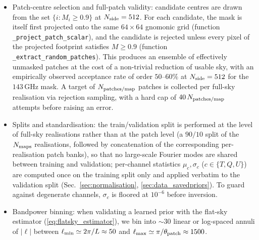 \documentclass[11pt]{article}
\theoremstyle{definition}
\begin{document}
\begin{itemize}[leftmargin=1.5em,itemsep=0.1em]
\begin{equation}
    L = N_{\rm patch}\,\theta_{\rm patch}\simeq 7.15^\circ
    \quad\Rightarrow\quad
    L^2\simeq 51\ \mathrm{deg}^2,
  \end{equation}
  i.e.\ $f_{\rm sky}^{\rm patch}\simeq 0.12\%$ per patch. Curvature corrections are of order $L^2\!\sim\!1.5\times 10^{-2}$ and the flat-sky approximation is accurate. Patch projection is implemented by \texttt{healpy.projector.GnomonicProj}: the temperature channel is resampled by scalar interpolation, while $(Q,U)$ are first resampled and then spin-2 rotated to the local patch frame using Eq.~(\ref{eq:flatsky_estimator})\,'s spin-2 matrix, with rotation angle $\psi(\hat n)$ computed numerically by finite-differencing the projection along the local north direction (function \texttt{\_project\_patch\_tqu}, flag \texttt{rotate\_pol=True}; Sec.~\ref{sec:flatsky}). Non-finite values introduced at projection edges are explicitly replaced by zero.
  \item Patch-centre selection and full-patch validity: candidate centres are drawn from the set $\{i:M_i\geq 0.9\}$ at $N_{\rm side}=512$. For each candidate, the mask is itself first projected onto the same $64\!\times\!64$ gnomonic grid (function \texttt{\_project\_patch\_scalar}), and the candidate is rejected unless every pixel of the projected footprint satisfies $M\!\geq\!0.9$ (function \texttt{\_extract\_random\_patches}). This produces an ensemble of effectively unmasked patches at the cost of a non-trivial reduction of usable sky, with an empirically observed acceptance rate of order $50$--$60\%$ at $N_{\rm side}=512$ for the $143\,\mathrm{GHz}$ mask. A target of $N_{\rm patches/map}$ patches is collected per full-sky realisation via rejection sampling, with a hard cap of $40\,N_{\rm patches/map}$ attempts before raising an error.
  \item Splits and standardisation: the train/validation split is performed at the level of full-sky realisations rather than at the patch level (a $90/10$ split of the $N_{\rm maps}$ realisations, followed by concatenation of the corresponding per-realisation patch banks), so that no large-scale Fourier modes are shared between training and validation; per-channel statistics $\mu_c,\sigma_c$ ($c\in\{T,Q,U\}$) are computed once on the training split only and applied verbatim to the validation split (Sec.~\ref{sec:normalisation}, \ref{sec:data_savedpriors}). To guard against degenerate channels, $\sigma_c$ is floored at $10^{-6}$ before inversion.
  \item Bandpower binning: when validating a learned prior with the flat-sky estimator (\ref{eq:flatsky_estimator}), we bin into $\sim 30$ linear or log-spaced annuli of $|\bm\ell|$ between $\ell_{\rm min}\simeq 2\pi/L\approx 50$ and $\ell_{\rm max}\simeq \pi/\theta_{\rm patch}\approx 1500$.
\end{itemize}
\end{document}
